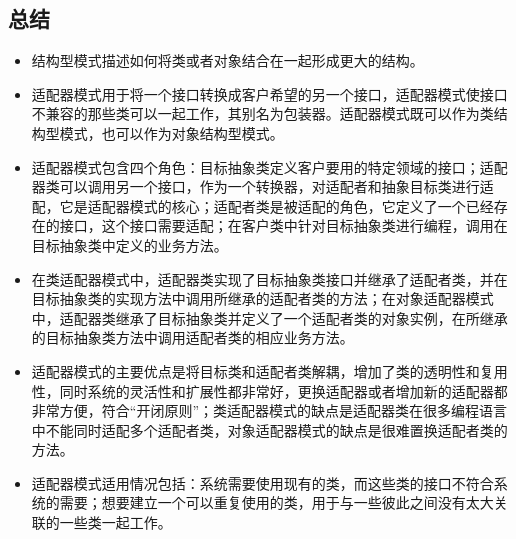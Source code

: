 \documentclass[letterpaper,10pt,english]{sphinxmanual}
\begin{document}
\subsection{总结}
\label{\detokenize{structural_patterns/adapter:id15}}\begin{itemize}
\item {} 
\sphinxAtStartPar
结构型模式描述如何将类或者对象结合在一起形成更大的结构。

\item {} 
\sphinxAtStartPar
适配器模式用于将一个接口转换成客户希望的另一个接口，适配器模式使接口不兼容的那些类可以一起工作，其别名为包装器。适配器模式既可以作为类结构型模式，也可以作为对象结构型模式。

\item {} 
\sphinxAtStartPar
适配器模式包含四个角色：目标抽象类定义客户要用的特定领域的接口；适配器类可以调用另一个接口，作为一个转换器，对适配者和抽象目标类进行适配，它是适配器模式的核心；适配者类是被适配的角色，它定义了一个已经存在的接口，这个接口需要适配；在客户类中针对目标抽象类进行编程，调用在目标抽象类中定义的业务方法。

\item {} 
\sphinxAtStartPar
在类适配器模式中，适配器类实现了目标抽象类接口并继承了适配者类，并在目标抽象类的实现方法中调用所继承的适配者类的方法；在对象适配器模式中，适配器类继承了目标抽象类并定义了一个适配者类的对象实例，在所继承的目标抽象类方法中调用适配者类的相应业务方法。

\item {} 
\sphinxAtStartPar
适配器模式的主要优点是将目标类和适配者类解耦，增加了类的透明性和复用性，同时系统的灵活性和扩展性都非常好，更换适配器或者增加新的适配器都非常方便，符合“开闭原则”；类适配器模式的缺点是适配器类在很多编程语言中不能同时适配多个适配者类，对象适配器模式的缺点是很难置换适配者类的方法。

\item {} 
\sphinxAtStartPar
适配器模式适用情况包括：系统需要使用现有的类，而这些类的接口不符合系统的需要；想要建立一个可以重复使用的类，用于与一些彼此之间没有太大关联的一些类一起工作。

\end{itemize}

\sphinxstepscope
\end{document}
